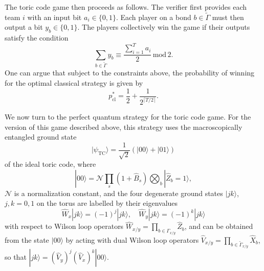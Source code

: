 \documentclass[prb,twocolumn,showpacs,amssymb,superscriptaddress]{revtex4-2}
\begin{document}
The toric code game then proceeds as follows. The verifier first provides each team $i$ with an input bit $a_i \in \{0,1\}$. Each player on a bond $b \in \widetilde{\Gamma}$ must then output a bit $y_b \in \{0,1\}$. The players collectively win the game if their outputs satisfy the condition
\begin{equation}
\sum_{b \in \widetilde{\Gamma}} y_b \equiv \frac{\sum_{i=1}^T a_i}{2} \, \mathrm{mod} \, 2.
\end{equation}
One can argue\cite{companion} that subject to the constraints above, the probability of winning for the optimal classical strategy is given by
\begin{equation}
\label{eq:tccwp}
p_{\mathrm{cl}}^* = \frac{1}{2} + \frac{1}{2^{\lceil T/2 \rceil}}.
\end{equation}

We now turn to the perfect quantum strategy for the toric code game. For the version of this game described above, this strategy uses the macroscopically entangled ground state
\begin{equation}
\label{eq:topcat}
|\psi_{\mathrm{TC}} \rangle = \frac{1}{\sqrt{2}} \left(|00\rangle + |0 1\rangle\right)
\end{equation}
of the ideal toric code, where
\begin{equation}
|0 0 \rangle = \mathcal{N} \prod_{s} (1+\hat{B}_s)\bigotimes_{b} |\hat{Z}_b = 1\rangle,
\end{equation}
$\mathcal{N}$ is a normalization constant, and the four degenerate ground states $|jk\rangle$, $j,k=0,1$ on the torus are labelled by their eigenvalues
\begin{equation}
\hat{W}_x |jk\rangle = (-1)^j |jk\rangle, \quad \hat{W}_y |jk\rangle = (-1)^k |jk\rangle
\end{equation}
with respect to Wilson loop operators $\hat{W}_{x/y} = \prod_{b \in \Gamma_{x/y}} \hat{Z}_b$, and can be obtained from the state $|00\rangle$ by acting with dual Wilson loop operators $\hat{V}_{x/y} = \prod_{b \in \widetilde{\Gamma}_{x/y}} \hat{X}_b$, so that $|jk\rangle = (\hat{V}_y)^j(\hat{V}_x)^k|00\rangle$.
\end{document}
